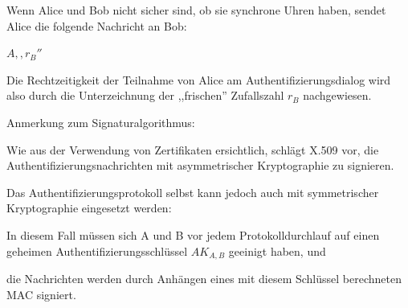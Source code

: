 \documentclass[a4paper]{article}
\begin{document}
\begin{multicols}{3}
\begin{itemize*}
\begin{itemize*}
                  \item Wenn Alice und Bob nicht sicher sind, ob sie synchrone Uhren haben, sendet Alice die folgende Nachricht an Bob:
            \end{itemize*}
            \begin{enumerate*}
                  \setcounter{enumi}{2}
                  \item $A,,r_B''$
            \end{enumerate*}
            \begin{itemize*}
                  \item Die Rechtzeitigkeit der Teilnahme von Alice am Authentifizierungsdialog wird also durch die Unterzeichnung der ,,frischen'' Zufallszahl $r_B$ nachgewiesen.
            \end{itemize*}
            \item Anmerkung zum Signaturalgorithmus:
            \begin{itemize*}
                  \item Wie aus der Verwendung von Zertifikaten ersichtlich, schlägt X.509 vor, die Authentifizierungsnachrichten mit asymmetrischer Kryptographie zu signieren.
                  \item Das Authentifizierungsprotokoll selbst kann jedoch auch mit symmetrischer Kryptographie eingesetzt werden:
                  \begin{itemize*}
                        \item In diesem Fall müssen sich A und B vor jedem Protokolldurchlauf auf einen geheimen Authentifizierungsschlüssel $AK_{A,B}$ geeinigt haben, und
                        \item die Nachrichten werden durch Anhängen eines mit diesem Schlüssel berechneten MAC signiert.
                  \end{itemize*}
            \end{itemize*}
      \end{itemize*}


\end{multicols}
\end{document}
